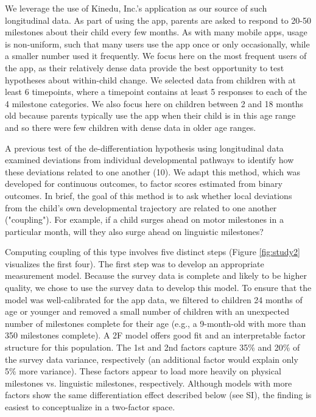 \documentclass[man]{apa7}
\begin{document}
We leverage the use of Kinedu, Inc.'s application as our source of such
longitudinal data. As part of using the app, parents are asked to
respond to 20-50 milestones about their child every few months. As with
many mobile apps, usage is non-uniform, such that many users use the app
once or only occasionally, while a smaller number used it frequently. We focus here on the most frequent users of the app, as their relatively dense data provide the best opportunity to test hypotheses about within-child change. We
selected data from children with at least 6 timepoints, where a
timepoint contains at least 5 responses to each of the 4 milestone
categories. We also focus here on children between 2 and 18 months old
because parents typically use the app when their child is in this age
range and so there were few children with dense data in older age ranges.

A previous test of the de-differentiation hypothesis using longitudinal data
examined deviations from individual developmental pathways to identify how these deviations related to one another (10). We adapt this
method, which was developed for continuous outcomes, to factor scores
estimated from binary outcomes. In brief, the goal of this method is to ask whether local deviations from the child's own developmental trajectory are related to one another ("coupling"). For example, if a child surges ahead on motor milestones in a particular month, will they also surge ahead on linguistic milestones? 

Computing coupling of this type involves five distinct steps (Figure
\ref{fig:study2} visualizes the first four). The first step was to develop an
appropriate measurement model. Because the survey data is complete and
likely to be higher quality, we chose to use the survey data to develop
this model. To ensure that the model was well-calibrated for the app
data, we filtered to children 24 months of age or younger and removed a
small number of children with an unexpected number of milestones
complete for their age (e.g., a 9-month-old with more than 350
milestones complete). A 2F model offers good fit and an interpretable
factor structure for this population. The 1st and 2nd factors capture 35\% and
20\% of the survey data variance, respectively (an additional factor
would explain only 5\% more variance). These factors appear to load more heavily on physical milestones vs. linguistic milestones, respectively. Although models with more factors
show the same differentiation effect described below (see SI), the
finding is easiest to conceptualize in a two-factor space.
 
\end{document}
